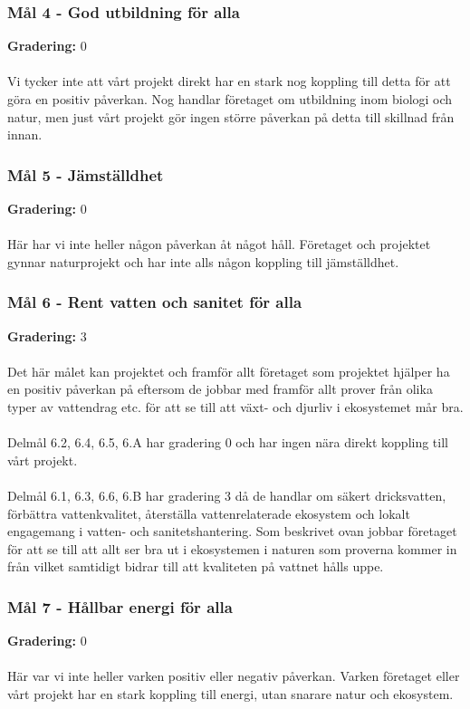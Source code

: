 \subsubsection{Mål 4 - God utbildning för alla}
\textbf{Gradering:} 0 
\\\\
Vi tycker inte att vårt projekt direkt har en stark nog koppling till detta för att göra en positiv påverkan. Nog handlar företaget om utbildning inom biologi och natur, men just vårt projekt gör ingen större påverkan på detta till skillnad från innan. 

\subsubsection{Mål 5 - Jämställdhet}
\textbf{Gradering:} 0 
\\\\
Här har vi inte heller någon påverkan åt något håll. Företaget och projektet gynnar naturprojekt och har inte alls någon koppling till jämställdhet.

\subsubsection{Mål 6 - Rent vatten och sanitet för alla}
\textbf{Gradering:} 3 
\\\\
Det här målet kan projektet och framför allt företaget som projektet hjälper ha en positiv påverkan på eftersom de jobbar med framför allt prover från olika typer av vattendrag etc. för att se till att växt- och djurliv i ekosystemet mår bra.
\\\\
Delmål 6.2, 6.4, 6.5, 6.A har gradering 0 och har ingen nära direkt koppling till vårt projekt.
\\\\
Delmål 6.1, 6.3, 6.6, 6.B har gradering 3 då de handlar om säkert dricksvatten, förbättra vattenkvalitet, återställa vattenrelaterade ekosystem och lokalt engagemang i vatten- och sanitetshantering. Som beskrivet ovan jobbar företaget för att se till att allt ser bra ut i ekosystemen i naturen som proverna kommer in från vilket samtidigt bidrar till att kvaliteten på vattnet hålls uppe. 

\subsubsection{Mål 7 - Hållbar energi för alla}
\textbf{Gradering:} 0 
\\\\
Här var vi inte heller varken positiv eller negativ påverkan. Varken företaget eller vårt projekt har en stark koppling till energi, utan snarare natur och ekosystem. 

